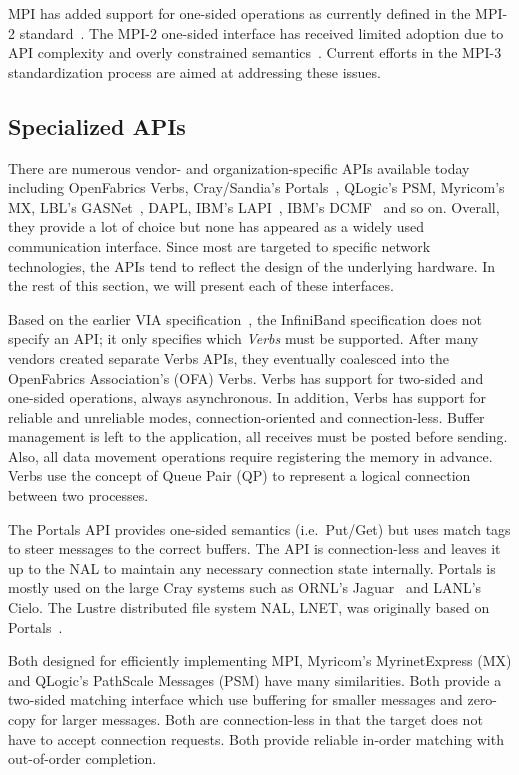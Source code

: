 MPI has added support for one-sided operations as currently defined
in the MPI-2 standard~\cite{geist96:_mpi2_lyon}. The MPI-2 one-sided
interface has received limited adoption due to API complexity and
overly constrained semantics~\cite{bonachea-upc-mpi2}. Current efforts
in the MPI-3 standardization process are aimed at addressing these
issues. 


\subsection{Specialized APIs} There are numerous vendor- and
organization-specific APIs available today including OpenFabrics
Verbs, Cray/Sandia's Portals~\cite{portals}, QLogic's
PSM, Myricom's MX, LBL's GASNet~\cite{gasnet}, 
DAPL, IBM's LAPI~\cite{lapi_a_1998}, IBM's 
DCMF~\cite{Kumar:2008:DCM:1375527.1375544} and so on. 
Overall, they provide a lot of choice but none has appeared as 
a widely used communication interface. Since most are targeted to 
specific network technologies, the APIs tend to reflect the design 
of the underlying hardware. In the rest of this section, we will 
present each of these interfaces.

Based on the earlier VIA specification~\cite{via}, the InfiniBand specification does not specify
an API; it only specifies which \emph{Verbs} must be supported. After many vendors created
separate Verbs APIs, they eventually coalesced into the OpenFabrics Association's (OFA)
Verbs. Verbs has support for two-sided and one-sided operations, always asynchronous. 
In addition, Verbs has support for reliable and unreliable modes, connection-oriented
and connection-less. Buffer management is left to the application, all receives must be 
posted before sending. Also, all data movement operations require registering the memory 
in advance. Verbs use the concept of Queue Pair (QP) to represent a logical connection between 
two processes.

The Portals API provides one-sided semantics (i.e.\ Put/Get) but uses match tags to steer
messages to the correct buffers. The API is connection-less and leaves it up to the NAL to
maintain any necessary connection state internally. Portals is mostly used on the large
Cray systems such as ORNL's Jaguar~\cite{jaguar_cug_2010} and LANL's Cielo.  The
Lustre distributed file system NAL, LNET, was originally based on Portals~\cite{lnet}.

Both designed for efficiently implementing MPI, Myricom's MyrinetExpress (MX) and 
QLogic's PathScale Messages (PSM) have many similarities. Both provide a two-sided matching 
interface which use buffering for smaller messages and zero-copy for larger messages.  
Both are connection-less in that the target does not have to accept connection requests.  Both provide reliable
in-order matching with out-of-order completion.

